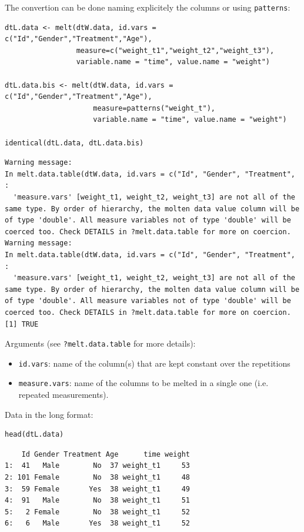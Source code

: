 \documentclass{article}
\begin{document}
The convertion can be done naming explicitely the columns or using \texttt{patterns}:
\lstset{language=r,label= ,caption= ,captionpos=b,numbers=none}
\begin{lstlisting}
dtL.data <- melt(dtW.data, id.vars = c("Id","Gender","Treatment","Age"), 
				 measure=c("weight_t1","weight_t2","weight_t3"), 
				 variable.name = "time", value.name = "weight")

dtL.data.bis <- melt(dtW.data, id.vars = c("Id","Gender","Treatment","Age"), 
					 measure=patterns("weight_t"), 
					 variable.name = "time", value.name = "weight")

identical(dtL.data, dtL.data.bis)
\end{lstlisting}

\begin{verbatim}
Warning message:
In melt.data.table(dtW.data, id.vars = c("Id", "Gender", "Treatment",  :
  'measure.vars' [weight_t1, weight_t2, weight_t3] are not all of the same type. By order of hierarchy, the molten data value column will be of type 'double'. All measure variables not of type 'double' will be coerced too. Check DETAILS in ?melt.data.table for more on coercion.
Warning message:
In melt.data.table(dtW.data, id.vars = c("Id", "Gender", "Treatment",  :
  'measure.vars' [weight_t1, weight_t2, weight_t3] are not all of the same type. By order of hierarchy, the molten data value column will be of type 'double'. All measure variables not of type 'double' will be coerced too. Check DETAILS in ?melt.data.table for more on coercion.
[1] TRUE
\end{verbatim}


Arguments (see \texttt{?melt.data.table} for more details):
\begin{itemize}
\item \texttt{id.vars}: name of the column(s) that are kept constant over the repetitions
\item \texttt{measure.vars}: name of the columns to be melted in a single one
(i.e. repeated measurements).
\end{itemize}

\bigskip

Data in the long format:
\lstset{language=r,label= ,caption= ,captionpos=b,numbers=none}
\begin{lstlisting}
head(dtL.data)
\end{lstlisting}

\begin{verbatim}
    Id Gender Treatment Age      time weight
1:  41   Male        No  37 weight_t1     53
2: 101 Female        No  38 weight_t1     48
3:  59 Female       Yes  38 weight_t1     49
4:  91   Male        No  38 weight_t1     51
5:   2 Female        No  38 weight_t1     52
6:   6   Male       Yes  38 weight_t1     52
\end{verbatim}
\end{document}
